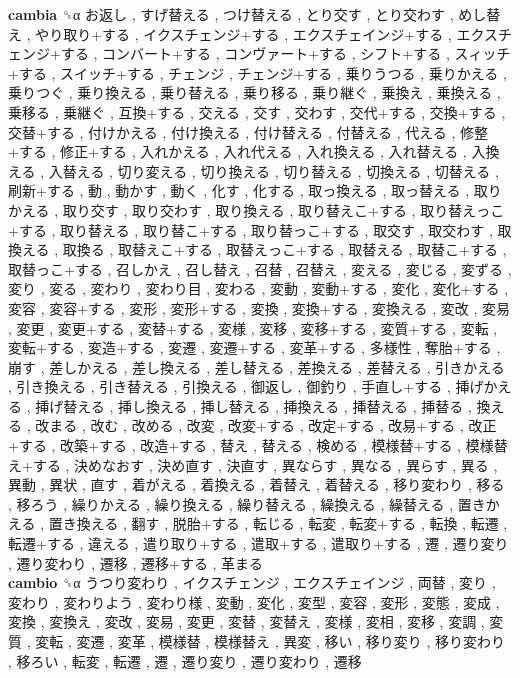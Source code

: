 \textbf{cambia} ␝α   お返し ,  すげ替える ,  つけ替える ,  とり交す ,  とり交わす ,  めし替え ,  やり取り+する ,  イクスチェンジ+する ,  エクスチェインジ+する ,  エクスチェンジ+する ,  コンバート+する ,  コンヴァート+する ,  シフト+する ,  スィッチ+する ,  スイッチ+する ,  チェンジ ,  チェンジ+する ,  乗りうつる ,  乗りかえる ,  乗りつぐ ,  乗り換える ,  乗り替える ,  乗り移る ,  乗り継ぐ ,  乗換え ,  乗換える ,  乗移る ,  乗継ぐ ,  互換+する ,  交える ,  交す ,  交わす ,  交代+する ,  交換+する ,  交替+する ,  付けかえる ,  付け換える ,  付け替える ,  付替える ,  代える ,  修整+する ,  修正+する ,  入れかえる ,  入れ代える ,  入れ換える ,  入れ替える ,  入換える ,  入替える ,  切り変える ,  切り換える ,  切り替える ,  切換える ,  切替える ,  刷新+する ,  動 ,  動かす ,  動く ,  化す ,  化する ,  取っ換える ,  取っ替える ,  取りかえる ,  取り交す ,  取り交わす ,  取り換える ,  取り替えこ+する ,  取り替えっこ+する ,  取り替える ,  取り替こ+する ,  取り替っこ+する ,  取交す ,  取交わす ,  取換える ,  取換る ,  取替えこ+する ,  取替えっこ+する ,  取替える ,  取替こ+する ,  取替っこ+する ,  召しかえ ,  召し替え ,  召替 ,  召替え ,  変える ,  変じる ,  変ずる ,  変り ,  変る ,  変わり ,  変わり目 ,  変わる ,  変動 ,  変動+する ,  変化 ,  変化+する ,  変容 ,  変容+する ,  変形 ,  変形+する ,  変換 ,  変換+する ,  変換える ,  変改 ,  変易 ,  変更 ,  変更+する ,  変替+する ,  変様 ,  変移 ,  変移+する ,  変質+する ,  変転 ,  変転+する ,  変造+する ,  変遷 ,  変遷+する ,  変革+する ,  多様性 ,  奪胎+する ,  崩す ,  差しかえる ,  差し換える ,  差し替える ,  差換える ,  差替える ,  引きかえる ,  引き換える ,  引き替える ,  引換える ,  御返し ,  御釣り ,  手直し+する ,  挿げかえる ,  挿げ替える ,  挿し換える ,  挿し替える ,  挿換える ,  挿替える ,  挿替る ,  換える ,  改まる ,  改む ,  改める ,  改変 ,  改変+する ,  改定+する ,  改易+する ,  改正+する ,  改築+する ,  改造+する ,  替え ,  替える ,  検める ,  模様替+する ,  模様替え+する ,  決めなおす ,  決め直す ,  決直す ,  異ならす ,  異なる ,  異らす ,  異る ,  異動 ,  異状 ,  直す ,  着がえる ,  着換える ,  着替え ,  着替える ,  移り変わり ,  移る ,  移ろう ,  繰りかえる ,  繰り換える ,  繰り替える ,  繰換える ,  繰替える ,  置きかえる ,  置き換える ,  翻す ,  脱胎+する ,  転じる ,  転変 ,  転変+する ,  転換 ,  転遷 ,  転遷+する ,  違える ,  遣り取り+する ,  遣取+する ,  遣取り+する ,  遷 ,  遷り変り ,  遷り変わり ,  遷移 ,  遷移+する ,  革まる   \\
\textbf{cambio} ␝α   うつり変わり ,  イクスチェンジ ,  エクスチェインジ ,  両替 ,  変り ,  変わり ,  変わりよう ,  変わり様 ,  変動 ,  変化 ,  変型 ,  変容 ,  変形 ,  変態 ,  変成 ,  変換 ,  変換え ,  変改 ,  変易 ,  変更 ,  変替 ,  変替え ,  変様 ,  変相 ,  変移 ,  変調 ,  変質 ,  変転 ,  変遷 ,  変革 ,  模様替 ,  模様替え ,  異変 ,  移い ,  移り変り ,  移り変わり ,  移ろい ,  転変 ,  転遷 ,  遷 ,  遷り変り ,  遷り変わり ,  遷移   \\
